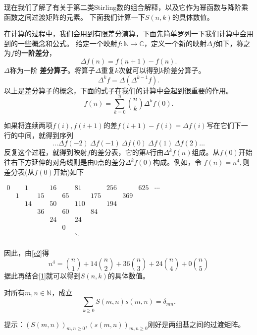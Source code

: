 现在我们了解了有关于第二类Stirling数的组合解释，以及它作为幂函数与降阶乘函数之间过渡矩阵的元素。
下面我们计算一下$S(n,k)$的具体数值。

在计算的过程中，我们会用到有限差分演算，下面先简单罗列一下我们计算中会用到的一些概念和公式。
给定一个映射$f:\mathbb{N}\rightarrow\mathbb{C}$，定义一个新的映射$\Delta
f$如下，称之为$f$的{\bf 一阶差分}，
$$\Delta f(n)=f(n+1)-f(n).$$
$\Delta$称为一阶{\bf
差分算子}。将算子$\Delta$重复$k$次就可以得到$k$阶差分算子。
$$\Delta^k f=\Delta(\Delta^{k-1}f).$$
以上是差分算子的概念，下面的式子在我们的计算中会起到很重要的作用。
\begin{equation}
f(n)=\sum_{k=0}^n{n\choose k}\Delta^k f(0).\label{e2}
\end{equation}

如果将连续两项$f(i),f(i+1)$的差$f(i+1)-f(i)=\Delta
f(i)$写在它们下一行的中间，就得到序列
$$\ldots \Delta f(-2)\ \Delta f(-1)\ \Delta f(0)\ \Delta f(1)\ \Delta f(2)\ldots$$
反复这个过程，就得到映射$f$的差分表，它的第$k$行由$\Delta^k
f(n)$组成。从$f(0)$开始往右下方延伸的对角线则是由0点的差分$\Delta^k
f(0)$构成。例如，令 $f(n)=n^4,$则差分表(从$f(0)$开始)如下


$\begin{array}{cccccccccccc}
  0 &  & 1 &  & 16 &  & 81 &  & 256 &  & 625 & \cdots \\
   & 1 &  & 15 &  & 65 &  & 175 &  & 369 &  &  \\
   &  & 14 &  & 50 &  & 110 &  & 194 &  &  &  \\
   &  &  & 36 &  & 60 &  & 84 &  &  &  &  \\
   &  &  &  & 24 &  & 24 &  &  &  &  &  \\
   &  &  &  &  & 0 &  &  &  &  &  &  \\
   &  &  &  &  &  & \ddots &  &  &  &  &  \\
   &  &  &  &  &  &  &  &  &  &  &
\end{array}$

因此，由\ref{e2}得
$$n^4={n\choose 1}+14{n\choose 2}+36{n\choose 3}+24{n\choose 4}+0{n\choose 5}$$
据此再结合\ref{1}就可以得到$S(n,k)$的具体数值。

\begin{ex} 对所有$m,n\in\mathbb{N}$，成立
$$\sum_{k\geq 0}S(m,n)s(m,n)=\delta_{mn}.$$
\end{ex}

提示：$\left(S(m,n)\right)_{m,n\geq 0},\left(s(m,n)\right)_{m,n\geq
0}$刚好是两组基之间的过渡矩阵。

